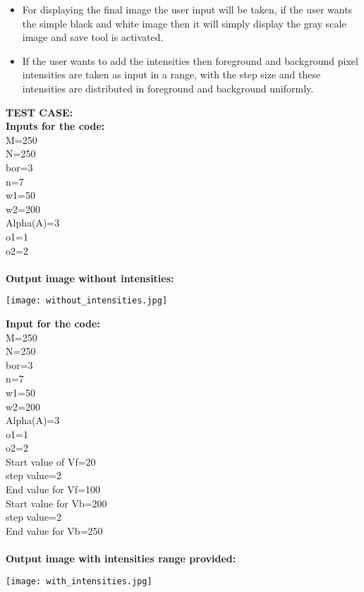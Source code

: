 \documentclass{report}
\begin{document}
\begin{itemize}
    \item For displaying the final image the user input will be taken, if the user wants the simple black and white image then it will simply display the gray scale image and save tool is activated.
    \item If the user wants to add the intensities then foreground and background pixel intensities are taken as input in a range, with the step size and these intensities are distributed in foreground and background uniformly.\\
\end{itemize}

\noindent \textbf{TEST CASE:}\\
\noindent \textbf{Inputs for the code:}\\
\noindent M=250\\
N=250\\
bor=3\\
n=7\\
w1=50\\
w2=200\\
Alpha(A)=3\\
o1=1\\
o2=2\\
\\
\noindent \textbf{Output image without intensities:}\\
\begin{center}
\texttt{[image: without\_intensities.jpg]}
\end{center}

\newpage
\noindent \textbf{Input for the code:}\\
\noindent M=250\\
N=250\\
bor=3\\
n=7\\
w1=50\\
w2=200\\
Alpha(A)=3\\
o1=1\\
o2=2\\
Start value of Vf=20\\
step value=2\\
End value for Vf=100\\
Start value for Vb=200\\
step value=2\\
End value for Vb=250\\
\\
\noindent \textbf{Output image with intensities range provided:}\\
\begin{graphics}
\begin{center}
\texttt{[image: with\_intensities.jpg]}
\end{center}
\end{graphics}
\end{document}
